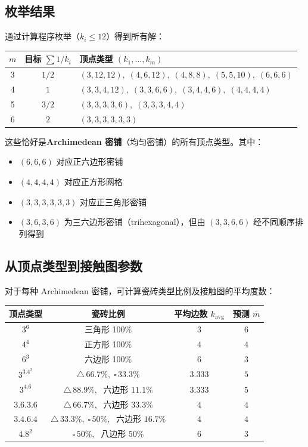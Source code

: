 \documentclass[12pt,a4paper]{article}
\theoremstyle{plain}
\theoremstyle{definition}
\theoremstyle{remark}
\begin{document}
\subsection{枚举结果}

通过计算程序枚举（$k_i \le 12$）得到所有解：

{\small
\begin{center}
\begin{tabular}{c|c|l}
\toprule
$m$ & 目标 $\sum 1/k_i$ & 顶点类型 $(k_1, \dots, k_m)$ \\
\midrule
3 & $1/2$ & $(3,12,12),\;(4,6,12),\;(4,8,8),\;(5,5,10),\;(6,6,6)$ \\
4 & $1$   & $(3,3,4,12),\;(3,3,6,6),\;(3,4,4,6),\;(4,4,4,4)$ \\
5 & $3/2$ & $(3,3,3,3,6),\;(3,3,3,4,4)$ \\
6 & $2$   & $(3,3,3,3,3,3)$ \\
\bottomrule
\end{tabular}
\end{center}
\par}

这些恰好是\textbf{Archimedean 密铺}（均匀密铺）的所有顶点类型。其中：
\begin{itemize}
    \item $(6,6,6)$ 对应正六边形密铺
    \item $(4,4,4,4)$ 对应正方形网格
    \item $(3,3,3,3,3,3)$ 对应正三角形密铺
    \item $(3,6,3,6)$ 为三六边形密铺（trihexagonal），但由 $(3,3,6,6)$ 经不同顺序排列得到
\end{itemize}

\subsection{从顶点类型到接触图参数}

对于每种 Archimedean 密铺，可计算瓷砖类型比例及接触图的平均度数：

{\small
\begin{center}
\begin{tabular}{c|c|c|c}
\toprule
顶点类型 & 瓷砖比例 & 平均边数 $k_{\text{avg}}$ & 预测 $\overline{m}$ \\
\midrule
$3^6$ & 三角形 100\% & $3$ & $6$ \\
$4^4$ & 正方形 100\% & $4$ & $4$ \\
$6^3$ & 六边形 100\% & $6$ & $3$ \\
$3^3.4^2$ & $\triangle\,66.7\%,\;\square\,33.3\%$ & $3.333$ & $5$ \\
$3^4.6$ & $\triangle\,88.9\%,\;$ 六边形 $11.1\%$ & $3.333$ & $5$ \\
$3.6.3.6$ & $\triangle\,66.7\%,\;$ 六边形 $33.3\%$ & $4$ & $4$ \\
$3.4.6.4$ & $\triangle\,33.3\%,\;\square\,50\%,\;$ 六边形 $16.7\%$ & $4$ & $4$ \\
$4.8^2$ & $\square\,50\%,\;$ 八边形 $50\%$ & $6$ & $3$ \\
\bottomrule
\end{tabular}
\end{center}
\par}
\end{document}
